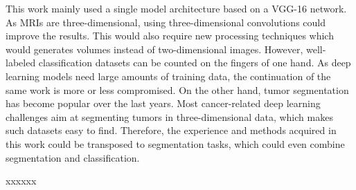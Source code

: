 This work mainly used a single model architecture based on a VGG-16 network. As MRIs are three-dimensional, using three-dimensional convolutions could improve the results. This would also require new processing techniques which would generates volumes instead of two-dimensional images. However, well-labeled classification datasets can be counted on the fingers of one hand. As deep learning models need large amounts of training data, the continuation of the same work is more or less compromised. On the other hand, tumor segmentation has become popular over the last years. Most cancer-related deep learning challenges aim at segmenting tumors in three-dimensional data, which makes such datasets easy to find. Therefore, the experience and methods acquired in this work could be transposed to segmentation tasks, which could even combine segmentation and classification. 

xxxxxx

